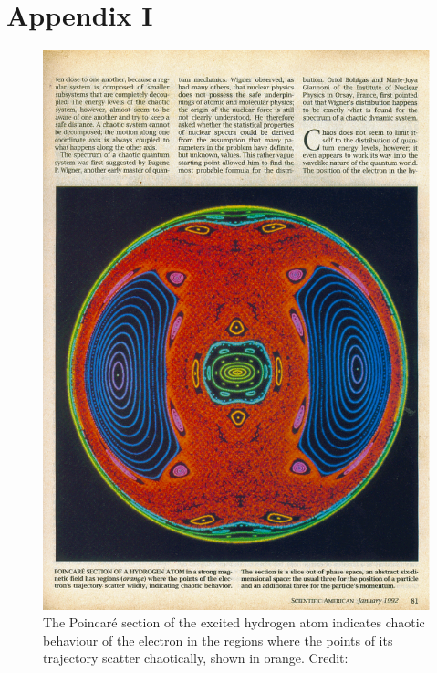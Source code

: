 \section*{Appendix I}
\begin{figure}[H]
\includegraphics[width=\textwidth]{1}
\caption{The Poincar\'e section of the excited hydrogen atom indicates chaotic behaviour of the electron in the regions where the points of its trajectory scatter chaotically, shown in orange. Credit:\cite{gutz}}
\label{fig:1}
\end{figure}
